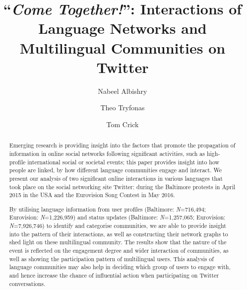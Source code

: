 \documentclass[sigconf]{acmart}
\begin{document}
\title{``{\emph{Come Together!}}'': Interactions of Language Networks and Multilingual Communities on Twitter}

\author{Nabeel Albishry}

\author{Theo Tryfonas}

\author{Tom Crick}

\renewcommand{\shortauthors}{N. Albishry et al.}


\begin{abstract}
Emerging research is providing insight into the factors that promote
the propagation of information in online social networks following
significant activities, such as high-profile international social or
societal events; this paper provides insight into how people are
linked, by how different language communities engage and interact. We
present our analysis of two significant online interactions in various
languages that took place on the social networking site Twitter:
during the Baltimore protests in April 2015 in the USA and the
Eurovision Song Contest in May 2016.

By utilising language information from user profiles (Baltimore:
{\emph{N}}=716,494; Eurovision: {\emph{N}}=1,226,959) and status
updates (Baltimore: {\emph{N}}=1,257,065; Eurovision:
{\emph{N}}=7,926,746) to identify and categorise communities, we are
able to provide insight into the pattern of their interactions, as
well as constructing their network graphs to shed light on these
multilingual community. The results show that the nature of the event
is reflected on the engagement degree and wider interaction of
communities, as well as showing the participation pattern of
multilingual users. This analysis of language communities may also
help in deciding which group of users to engage with, and hence
increase the chance of influential action when participating on
Twitter conversations.
\end{abstract}
\end{document}
